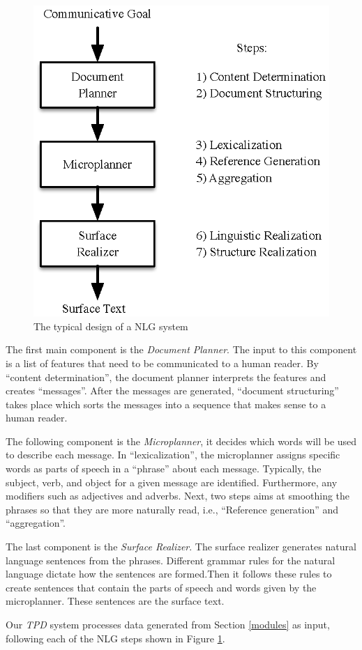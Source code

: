 \documentclass[10pt,conference]{IEEEtran}
\begin{document}
\begin{figure}[!htbp]
\centering
\includegraphics[width=0.69\columnwidth]{Figure/NLG}
\caption{The typical design of a NLG system}
\label{fig:nlg}
\end{figure}

The first main component is the \emph{Document Planner}. The input to this component is a list of features that need to be communicated to
a human reader. By ``content determination'', the document planner interprets the features and creates ``messages''.
After the messages are generated, ``document structuring'' takes place which sorts the messages into a sequence that makes sense to a human reader.

The following component is the \emph{Microplanner}, it decides which words will be used to describe each message. In ``lexicalization'',
the microplanner assigns specific words as parts of speech in a ``phrase'' about each message. Typically, the subject, verb, and object for
a given message are identified. Furthermore, any modifiers such as adjectives and adverbs. Next, two steps aims at smoothing the phrases
so that they are more naturally read, i.e.,  ``Reference generation'' and ``aggregation''.

The last component is the \emph{Surface Realizer}. The surface realizer generates natural language sentences from the phrases.
Different grammar rules for the natural language dictate how the sentences are formed.Then it follows these rules to create
sentences that contain the parts of speech and words given by the microplanner. These sentences are the surface text.


Our \emph{TPD} system processes data generated from Section \ref{modules} as input, following each of the NLG steps shown in Figure \ref{fig:nlg}.
\end{document}
